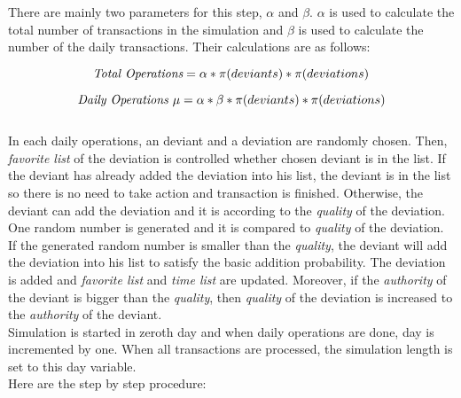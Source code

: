 \documentclass[12pt,a4paper]{report}
\begin{document}
	There are mainly two parameters for this step, $\alpha$ and $\beta$. $\alpha$ is used to calculate the total number of transactions in the simulation and $\beta$ is used to calculate the number of the daily transactions. Their calculations are as follows:

$$\emph{Total Operations} = \alpha * \pi(deviants) * \pi(deviations)$$

$$\emph{Daily Operations } \mu = \alpha * \beta * \pi(deviants) * \pi(deviations)$$ \\

	In each daily operations, an deviant and a deviation are randomly chosen. Then, \emph{favorite list} of the deviation is controlled whether chosen deviant is in the list. If the deviant has already added the deviation into his list, the deviant is in the list so there is no need to take action and transaction is finished. Otherwise, the deviant can add the deviation and it is according to the \emph{quality} of the deviation. One random number is generated and it is compared to \emph{quality} of the deviation. If the generated random number is smaller than the \emph{quality}, the deviant will add the deviation into his list to satisfy the basic addition probability. The deviation is added and \emph{favorite list} and \emph{time list} are updated. Moreover, if the \emph{authority} of the deviant is bigger than the \emph{quality}, then \emph{quality}  of the deviation is increased to the \emph{authority} of the deviant. \\

	Simulation is started in zeroth day and when daily operations are done, day is incremented by one. When all transactions are processed, the simulation length is set to this day variable. \\ 

	Here are the step by step procedure: 
\end{document}
